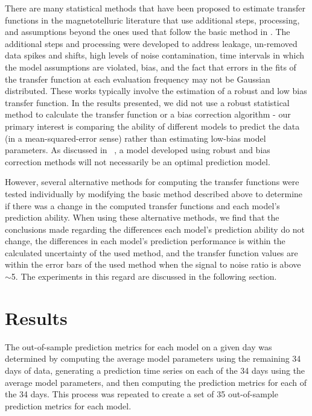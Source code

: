 \documentclass[draft,linenumbers]{agujournal2018}
\begin{document}
There are many statistical methods that have been proposed to estimate transfer functions in the magnetotelluric literature that use additional steps, processing, and assumptions \citep{Egbert1986,Chave1987,Chave1989,Jones1989,Larsen1996,Egbert1997,Eisel2001,Chave2004,Chave2012,Chave2017} beyond the ones used that follow the basic method in \cite{Simpson2005}. The additional steps and processing were developed to address leakage, un-removed data spikes and shifts, high levels of noise contamination, time intervals in which the model assumptions are violated, bias, and the fact that errors in the fits of the transfer function at each evaluation frequency may not be Gaussian distributed. These works typically involve the estimation of a robust and low bias transfer function. In the results presented, we did not use a robust statistical method to calculate the transfer function or a bias correction algorithm - our primary interest is comparing the ability of different models to predict the data (in a mean-squared-error sense) rather than estimating low-bias model parameters. As discussed in ~\cite{Weigel2017}, a model developed using robust and bias correction methods will not necessarily be an optimal prediction model.

However, several alternative methods for computing the transfer functions were tested individually by modifying the basic method described above to determine if there was a change in the computed transfer functions and each model's prediction ability. When using these alternative methods, we find that the conclusions made regarding the differences each model's prediction ability do not change, the differences in each model's prediction performance is within the calculated uncertainty of the used method, and the transfer function values are within the error bars of the used method when the signal to noise ratio is above $\sim$5. The experiments in this regard are discussed in the following section.

\section{Results}

The out-of-sample prediction metrics for each model on a given day was determined by computing the average model parameters using the remaining 34 days of data, generating a prediction time series on each of the 34 days using the average model parameters, and then computing the prediction metrics for each of the 34 days. This process was repeated to create a set of 35 out-of-sample prediction metrics for each model.
\end{document}
